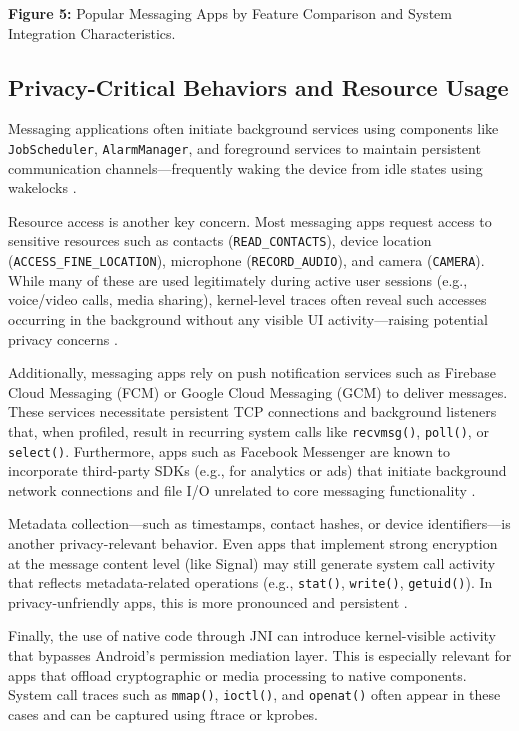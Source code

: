 \documentclass[a4paper,12pt]{report}
\begin{document}
\textbf{Figure 5:} Popular Messaging Apps by Feature Comparison and System Integration Characteristics.

\subsection{Privacy-Critical Behaviors and Resource Usage}
Messaging applications often initiate background services using components like \texttt{JobScheduler}, \texttt{AlarmManager}, and foreground services to maintain persistent communication channels—frequently waking the device from idle states using wakelocks \cite{androidwakelocks}.

Resource access is another key concern. Most messaging apps request access to sensitive resources such as contacts (\texttt{READ\_CONTACTS}), device location (\texttt{ACCESS\_FINE\_LOCATION}), microphone (\texttt{RECORD\_AUDIO}), and camera (\texttt{CAMERA}). While many of these are used legitimately during active user sessions (e.g., voice/video calls, media sharing), kernel-level traces often reveal such accesses occurring in the background without any visible UI activity—raising potential privacy concerns \cite{reardon2019leakage}.

Additionally, messaging apps rely on push notification services such as Firebase Cloud Messaging (FCM) or Google Cloud Messaging (GCM) to deliver messages. These services necessitate persistent TCP connections and background listeners that, when profiled, result in recurring system calls like \texttt{recvmsg()}, \texttt{poll()}, or \texttt{select()}. Furthermore, apps such as Facebook Messenger are known to incorporate third-party SDKs (e.g., for analytics or ads) that initiate background network connections and file I/O unrelated to core messaging functionality \cite{pi2018metadata}.

Metadata collection—such as timestamps, contact hashes, or device identifiers—is another privacy-relevant behavior. Even apps that implement strong encryption at the message content level (like Signal) may still generate system call activity that reflects metadata-related operations (e.g., \texttt{stat()}, \texttt{write()}, \texttt{getuid()}). In privacy-unfriendly apps, this is more pronounced and persistent \cite{signalprivacy2016}.

Finally, the use of native code through JNI can introduce kernel-visible activity that bypasses Android’s permission mediation layer. This is especially relevant for apps that offload cryptographic or media processing to native components. System call traces such as \texttt{mmap()}, \texttt{ioctl()}, and \texttt{openat()} often appear in these cases and can be captured using ftrace or kprobes.
\end{document}
